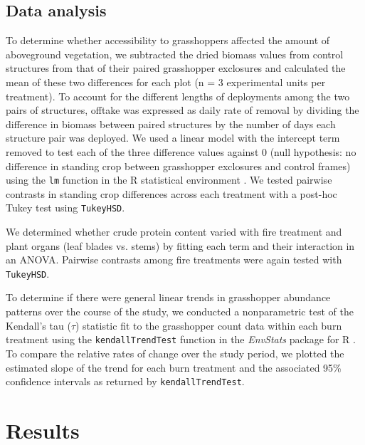 \documentclass[referee, 
	            sn-basic]
           {sn-jnl}
\begin{document}
\begin{linenumbers}
\subsection{Data analysis}

To determine whether accessibility to grasshoppers affected the amount of aboveground vegetation, we subtracted the dried biomass values from control structures from that of their paired grasshopper exclosures and calculated the mean of these two differences for each plot (n = 3 experimental units per treatment). 
To account for the different lengths of deployments among the two pairs of structures, offtake was expressed as daily rate of removal by dividing the difference in biomass between paired structures by the number of days each structure pair was deployed.  
We used a linear model with the intercept term removed to test each of the three difference values against 0 (null hypothesis: no difference in standing crop between grasshopper exclosures and control frames) using the \texttt{lm} function in the \textsf{R} statistical environment \citep{Rcore2020}. 
We tested pairwise contrasts in standing crop differences across each treatment with a post-hoc Tukey test using \texttt{TukeyHSD}.

We determined whether crude protein content varied with fire treatment and plant organs (leaf blades vs. stems) by fitting each term and their interaction in an ANOVA.
Pairwise contrasts among fire treatments were again tested with \texttt{TukeyHSD}.

To determine if there were general linear trends in grasshopper abundance patterns over the course of the study, we conducted a nonparametric test of the Kendall's tau (\(\tau\)) statistic fit to the grasshopper count data within each burn treatment using the \texttt{kendallTrendTest} function in the \emph{EnvStats} package for
\textsf{R} \citep{millard2013}.
To compare the relative rates of change over the study period, we plotted the estimated slope of the trend for each burn treatment and the associated 95\% confidence intervals as returned by \texttt{kendallTrendTest}.

\section{Results}


\end{linenumbers}
\end{document}
